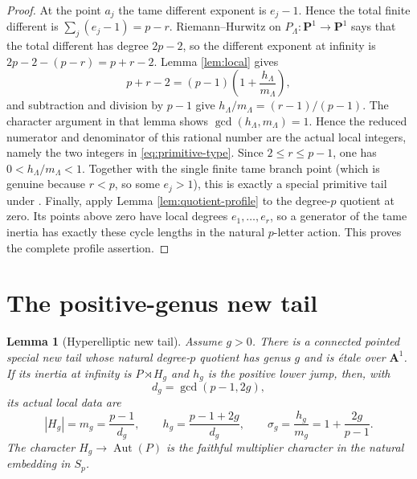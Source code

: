\documentclass[10pt,a4paper]{amsart}
\newtheorem{lemma}[theorem]{Lemma}
\numberwithin{equation}{section}
\begin{document}
\begin{proof}
At the point $a_j$ the tame different exponent is $e_j-1$.  Hence the total
finite different is
$\sum_j(e_j-1)=p-r$.  Riemann--Hurwitz on
$P_\Lambda:\mathbf P^1\to\mathbf P^1$ says that the total different has
degree $2p-2$, so the different exponent at infinity is
$2p-2-(p-r)=p+r-2$.  Lemma \ref{lem:local} gives
\[
 p+r-2=(p-1)\left(1+\frac{h_\Lambda}{m_\Lambda}\right),
\]
and subtraction and division by $p-1$ give
$h_\Lambda/m_\Lambda=(r-1)/(p-1)$.  The character argument in that lemma
shows
$\gcd(h_\Lambda,m_\Lambda)=1$.  Hence the reduced numerator and denominator
of this rational number are the actual local integers, namely the two
integers in \eqref{eq:primitive-type}.  Since
$2\leq r\leq p-1$, one has
$0<h_\Lambda/m_\Lambda<1$.  Together with the single finite tame branch
point (which is genuine because $r<p$, so some $e_j>1$), this is exactly a
special primitive tail under
\cite[Definitions 2.9--2.10]{WewersThree}.  Finally, apply Lemma
\ref{lem:quotient-profile} to the degree-$p$ quotient at zero.  Its points
above zero have local degrees $e_1,\ldots,e_r$, so a generator of the tame
inertia has exactly these cycle lengths in the natural $p$-letter action.
This proves the complete profile assertion.
\end{proof}

\section{The positive-genus new tail}

\begin{lemma}[Hyperelliptic new tail]\label{lem:newtail}
Assume $g>0$.  There is a connected pointed special new tail whose natural
degree-$p$ quotient has genus $g$ and is étale over $\mathbf A^1$.  If its
inertia at infinity is
$P\rtimes H_g$ and $h_g$ is the positive lower jump, then, with
\[
 d_g=\gcd(p-1,2g),
\]
its actual local data are
\[
 |H_g|=m_g=\frac{p-1}{d_g},\qquad
 h_g=\frac{p-1+2g}{d_g},\qquad
 \sigma_g=\frac{h_g}{m_g}=1+\frac{2g}{p-1}.
 \label{eq:new-type}
\]
The character $H_g\to\operatorname{Aut}(P)$ is the faithful multiplier
character in the natural embedding in $S_p$.
\end{lemma}
\end{document}
